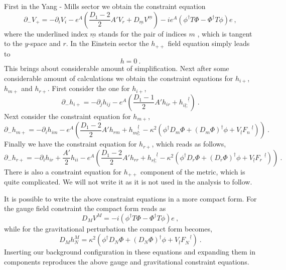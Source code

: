 \documentclass[a4paper,12pt]{article}
\begin{document}
First in the Yang - Mills sector we obtain the constraint equation
\begin{equation}
\partial_- V_+ = - \partial_i V_i - e^A \left(\frac{D_1 -2}{2} A' V_r
+ D_{\underline m} V^{\underline m}\right) -ie^A
\left(\phi^{\dagger}T\Phi - \Phi^{\dagger}T\phi\right)e~,
\label{v+}
\end{equation}
where the underlined index $\underline m$ stands for the pair of
indices $m$ , which is tangent to the $y$-space and $r$. In the
Einstein sector the $h_{++}$ field equation simply leads to
\begin{equation}
h=0~.
\end{equation}
This brings about considerable amount  of simplification. Next after
some considerable amount of calculations  we obtain the constraint
equations for $h_{i+}$, $h_{m+}$ and $h_{r+}$. First consider the one
for $h_{i+}$,
\begin{equation}
\partial_{-} h_{i+}= - \partial_{j} h_{ij}  -e^A\left(\frac{D_1-1}{2}
A' h_{ir}  + h_{i\underline l ;}^{\quad\underline l}\right)~.
\label{h+1}
\end{equation}
Next consider the constraint equation for $h_{m+}$,
\begin{equation}
\partial_{-} h_{m+}= - \partial_{i} h_{im} -e^A \left(\frac{D_1
-2}{2} A' h_{rm} + h_{m\underline l ;}^{\quad\underline l}
-\kappa^2\left(\phi^{\dagger} D_m\Phi + (D_m
 \Phi)^{\dagger}\phi + V_{\underline l}F_n^{\quad\underline
 l}\right)\right)~.
 \label{h+2}
\end{equation}
Finally we have the constraint equation for  $h_{r+}$, which reads
as follows,
\begin{equation}
\partial_{-} h_{r+}= - \partial_{i} h_{ir}  + \frac{A'}{2} h_{ii}-e^A
\left(\frac{D_1 -2}{2} A' h_{rr} + h_{r\underline l
;}^{\quad\underline l} -\kappa^2\left(\phi^{\dagger} D_r\Phi + (D_r
\Phi)^{\dagger}\phi+ V_{\underline l}F_r^{\quad\underline
l}\right)\right)~.
 \label{h+3}
\end{equation}
There is also a constraint equation for $h_{++}$ component of the
metric, which is quite complicated. We will not write it as it is not
used in the analysis to follow.

It is possible to write the above constraint equations in a more
compact form. For the gauge field constraint the compact form reads
as
\begin{equation}
D_MV^M= -i \left(\phi^{\dagger}T\Phi -
\Phi^{\dagger}T\phi\right)e~,
\end{equation}
 while for the gravitational perturbation the compact form becomes,
\begin{equation}
D_M h^{M}_{N} = \kappa^2\left(\phi^{\dagger} D_N\Phi +
(D_N \Phi)^{\dagger}\phi+ V_{\underline l}F_N^{\quad\underline
l}\right)~.
\end{equation}
Inserting our background configuration in these equations and
expanding them in components reproduces the above gauge and
gravitational constraint equations.
\end{document}
